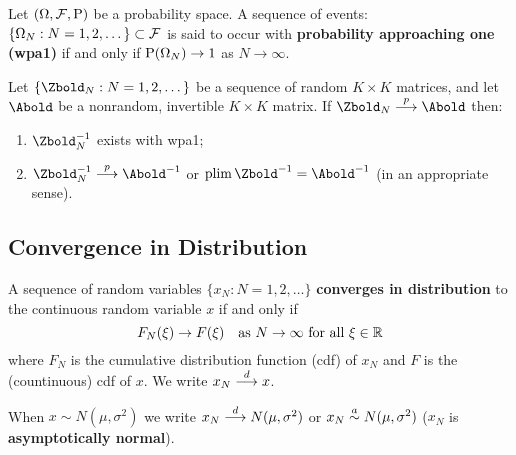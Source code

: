 \documentclass[11pt, oneside, a4paper, article]{article}
\numberwithin{equation}{section}
\begin{document}
\begin{defn} 
	Let $(\Omega, \mathcal{F}, \text{P})$ be a probability space.
	A sequence of events:
	$\{\Omega_{N}: N = 1, 2, \dots\} \subset \mathcal{F}$ 
	is said to occur with \textbf{probability approaching one (wpa1)} 
	if and only if
	$\text{P}(\Omega_{N}) \to 1$ as $N \to \infty$.
\end{defn}

\begin{cor} 
	Let $\seq{\Zbold_{N} : N = 1,2,\dots}$ 
	be a sequence of random $K \times K$ matrices, and let
	$\Abold$ be a nonrandom, invertible $K \times K$ matrix.
	If $\Zbold_{N} \arrowp \Abold$ then:
	\vspace{-1 ex}
	\begin{enumerate}[noitemsep]
		\item $\Zbold_{N}^{-1}$ exists with wpa1;
		\item $\Zbold_{N}^{-1} \arrowp \Abold^{-1}$ or
			$\plim \Zbold^{-1} = \Abold^{-1}$ (in an appropriate sense).
	\end{enumerate}
\end{cor}

\subsection{Convergence in Distribution}

\begin{defn} 
A sequence of random variables $\{x_{N} : N=1, 2, \dots\}$ 
\textbf{converges in distribution} to the continuous random variable $x$
if and only if
\begin{equation*}
	F_{N}(\xi) \to F(\xi) \quad \text{as } N \to \infty 
	\text{ for all } \xi \in \mathbb{R}
\end{equation*}
where $F_{N}$ is the cumulative distribution function (cdf) of $x_{N}$ and $F$ is the (countinuous) cdf of $x$.
We write $x_{N}  \overset{d}{\longrightarrow}  x$.
\end{defn}

\begin{remark}
	When $x \sim N(\mu, \sigma^2)$ we write
	$x_{N}  \overset{d}{\longrightarrow}  N(\mu, \sigma^2)$ or
	$x_{N}  \overset{a}{\sim}  N(\mu, \sigma^2)$
	($x_{N}$ is \textbf{asymptotically normal}).
\end{remark}
\end{document}
